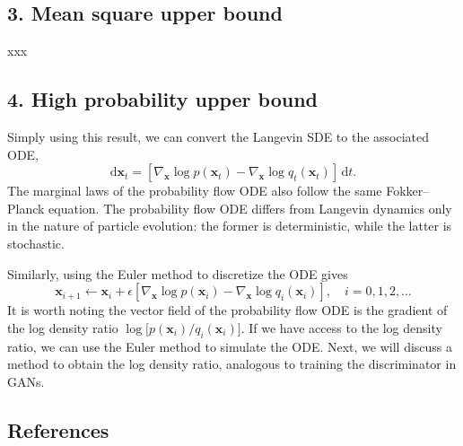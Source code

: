 \cite{tropp2012,minsker2017}


\subsection*{3. Mean square upper bound}
xxx






\subsection*{4. High probability upper bound}
Simply using this result, we can convert the Langevin SDE to the associated ODE,
\[
\mathrm{d} \mathbf{x}_t = \left [\nabla_\mathbf{x} \log p(\mathbf{x}_t)- \nabla_\mathbf{x} \log q_t(\mathbf{x}_t)\right]\,\mathrm{d}t.
\]
The marginal laws of the probability flow ODE also follow the same Fokker--Planck equation. The probability flow ODE differs from Langevin dynamics only in the nature of particle evolution: the former is deterministic, while the latter is stochastic. 

Similarly, using the Euler method to discretize the ODE gives 
\[
\mathbf{x}_{i+1} \leftarrow \mathbf{x}_{i} + \epsilon \left[\nabla_{\mathbf{x}} \log {p(\mathbf{x}_i)}- \nabla_{\mathbf{x}} \log {q_{i}({\mathbf{x}_i})}\right], \quad i=0, 1, 2,\dots
\]
It is worth noting the vector field of the probability flow ODE is the gradient of the log density ratio $\log \big[p(\mathbf{x}_i) / q_{i}({\mathbf{x}_i})\big]$. If we have access to the log density ratio, we can use the Euler method to simulate the ODE. Next, we will discuss a method to obtain the log density ratio, analogous to training the discriminator in GANs.



\subsection*{References}

